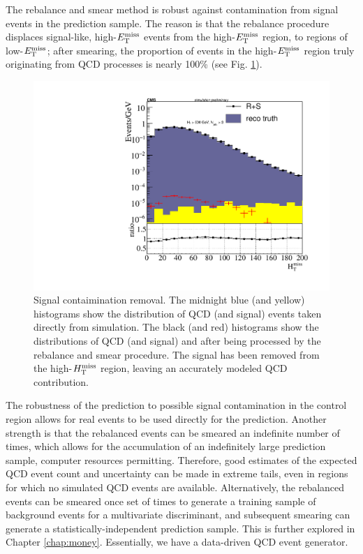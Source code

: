 The rebalance and smear method is robust against contamination from signal events in the prediction sample. The reason is that the rebalance procedure displaces signal-like, high-$E_{\text{T}}^{\rm miss}$ events from the high-$E_{\text{T}}^{\rm miss}$ region, to regions of low-$E_{\text{T}}^{\rm miss}$; after smearing, the proportion of events in the high-$E_{\text{T}}^{\rm miss}$ region truly originating from QCD processes is nearly 100\% (see Fig. \ref{fig:RplusSContamination}). 
\begin{figure}[tb!]
\centering
\includegraphics[width=0.6\linewidth]{figures/SusySearches/Ra2b2016/RplusSContam.pdf}
\caption{Signal contaimination removal. The midnight blue (and yellow) histograms show the distribution of QCD (and signal) events taken directly from simulation. The black (and red) histograms show the distributions of QCD (and signal) and after being processed by the rebalance and smear procedure. The signal has been removed from the high-$H_{\text{T}}^{\rm miss}$ region, leaving an accurately modeled QCD contribution.}
\label{fig:RplusSContamination}
\end{figure}
The robustness of the prediction to possible signal contamination in the control region allows for real events to be used directly for the prediction. Another strength is that the rebalanced events can be smeared an indefinite number of times, which allows for the accumulation of an indefinitely large prediction sample, computer resources permitting. Therefore, good estimates of the expected QCD event count and uncertainty can be made in extreme tails, even in regions for which no simulated QCD events are available. Alternatively, the rebalanced events can be smeared once set of times to generate a training sample of background events for a multivariate discriminant, and subsequent smearing can generate a statistically-independent prediction sample. This is further explored in Chapter \ref{chap:money}. Essentially, we have a data-driven QCD event generator.
\FloatBarrier


